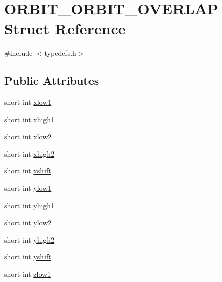 \hypertarget{struct_o_r_b_i_t___o_r_b_i_t___o_v_e_r_l_a_p}{\section{O\-R\-B\-I\-T\-\_\-\-O\-R\-B\-I\-T\-\_\-\-O\-V\-E\-R\-L\-A\-P Struct Reference}
\label{struct_o_r_b_i_t___o_r_b_i_t___o_v_e_r_l_a_p}
}


{\ttfamily \#include $<$typedefs.\-h$>$}

\subsection*{Public Attributes}
\begin{DoxyCompactItemize}
\item 
short int \hyperlink{struct_o_r_b_i_t___o_r_b_i_t___o_v_e_r_l_a_p_aed20f95733eaeaba7afabd32b12b8b23}{xlow1}
\item 
short int \hyperlink{struct_o_r_b_i_t___o_r_b_i_t___o_v_e_r_l_a_p_a21653cf36d18e3a6a46884bdebed019b}{xhigh1}
\item 
short int \hyperlink{struct_o_r_b_i_t___o_r_b_i_t___o_v_e_r_l_a_p_a6282eeed6d63372c085c9c6c7e8a3956}{xlow2}
\item 
short int \hyperlink{struct_o_r_b_i_t___o_r_b_i_t___o_v_e_r_l_a_p_a1883498766e26bd666a5ad7f3e86f3d4}{xhigh2}
\item 
short int \hyperlink{struct_o_r_b_i_t___o_r_b_i_t___o_v_e_r_l_a_p_a4476672a0a177a060bfc3b50dc3299aa}{xshift}
\item 
short int \hyperlink{struct_o_r_b_i_t___o_r_b_i_t___o_v_e_r_l_a_p_a80a269c696e29b0de13f7327bac5a93c}{ylow1}
\item 
short int \hyperlink{struct_o_r_b_i_t___o_r_b_i_t___o_v_e_r_l_a_p_aa52300a61625f4faeaa47841336bea7d}{yhigh1}
\item 
short int \hyperlink{struct_o_r_b_i_t___o_r_b_i_t___o_v_e_r_l_a_p_a6bf3c3e91023bb1f7ecda9bf544deb41}{ylow2}
\item 
short int \hyperlink{struct_o_r_b_i_t___o_r_b_i_t___o_v_e_r_l_a_p_a15e62d2c1937fa4e56674a031a6c5d08}{yhigh2}
\item 
short int \hyperlink{struct_o_r_b_i_t___o_r_b_i_t___o_v_e_r_l_a_p_ac64d297727c62d0b60504a1c11292c31}{yshift}
\item 
short int \hyperlink{struct_o_r_b_i_t___o_r_b_i_t___o_v_e_r_l_a_p_a3a9369f6e16838204a9880dba09e0982}{zlow1}
\item 

\end{DoxyCompactItemize}
